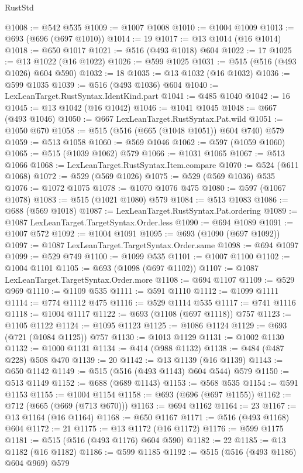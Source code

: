 \begin{lexlean}{RustStd}
\begin{coremodule}
@1008 := @542 @535
@1009 := @1007 @1008
@1010 := @1004 @1009
@1013 := @693 (@696 (@697 @1010))
@1014 := 19
@1017 := @13 @1014 (@16 @1014)
@1018 := @650 @1017
@1021 := @516 (@493 @1018) @604
@1022 := 17
@1025 := @13 @1022 (@16 @1022)
@1026 := @599 @1025
@1031 := @515 (@516 (@493 @1026) @604 @590)
@1032 := 18
@1035 := @13 @1032 (@16 @1032)
@1036 := @599 @1035
@1039 := @516 (@493 @1036) @604
@1040 := LexLeanTarget.RustSyntax.IdentKind.part
@1041 := @485 @1040
@1042 := 16
@1045 := @13 @1042 (@16 @1042)
@1046 := @1041 @1045
@1048 := @667 (@493 @1046)
@1050 := @667 LexLeanTarget.RustSyntax.Pat.wild
@1051 := @1050 @670
@1058 := @515 (@516 (@665 (@1048 @1051)) @604 @740) @579
@1059 := @513 @1058
@1060 := @569 @1046
@1062 := @597 (@1059 @1060)
@1065 := @515 (@1039 @1062) @579
@1066 := @1031 @1065
@1067 := @513 @1066
@1068 := LexLeanTarget.RustSyntax.Item.compare
@1070 := @524 (@611 @1068)
@1072 := @529 (@569 @1026)
@1075 := @529 (@569 @1036) @535
@1076 := @1072 @1075
@1078 := @1070 @1076 @475
@1080 := @597 (@1067 @1078)
@1083 := @515 (@1021 @1080) @579
@1084 := @513 @1083
@1086 := @688 (@569 @1018)
@1087 := LexLeanTarget.RustSyntax.Pat.ordering
@1089 := @1087 LexLeanTarget.TargetSyntax.Order.less
@1090 := @694 @1089
@1091 := @1007 @572
@1092 := @1004 @1091
@1095 := @693 (@1090 (@697 @1092))
@1097 := @1087 LexLeanTarget.TargetSyntax.Order.same
@1098 := @694 @1097
@1099 := @529 @749
@1100 := @1099 @535
@1101 := @1007 @1100
@1102 := @1004 @1101
@1105 := @693 (@1098 (@697 @1102))
@1107 := @1087 LexLeanTarget.TargetSyntax.Order.more
@1108 := @694 @1107
@1109 := @529 @969
@1110 := @1109 @535
@1111 := @591 @1110
@1112 := @1099 @1111
@1114 := @774 @1112 @475
@1116 := @529 @1114 @535
@1117 := @741 @1116
@1118 := @1004 @1117
@1122 := @693 (@1108 (@697 @1118)) @757
@1123 := @1105 @1122
@1124 := @1095 @1123
@1125 := @1086 @1124
@1129 := @693 (@721 (@1084 @1125)) @757
@1130 := @1013 @1129
@1131 := @1002 @1130
@1132 := @1000 @1131
@1134 := @414 (@988 @1132)
@1138 := @484 (@487 @228) @508 @470
@1139 := 20
@1142 := @13 @1139 (@16 @1139)
@1143 := @650 @1142
@1149 := @515 (@516 (@493 @1143) @604 @544) @579
@1150 := @513 @1149
@1152 := @688 (@689 @1143)
@1153 := @568 @535
@1154 := @591 @1153
@1155 := @1004 @1154
@1158 := @693 (@696 (@697 @1155))
@1162 := @712 (@665 (@669 (@713 @670)))
@1163 := @694 @1162
@1164 := 23
@1167 := @13 @1164 (@16 @1164)
@1168 := @650 @1167
@1171 := @516 (@493 @1168) @604
@1172 := 21
@1175 := @13 @1172 (@16 @1172)
@1176 := @599 @1175
@1181 := @515 (@516 (@493 @1176) @604 @590)
@1182 := 22
@1185 := @13 @1182 (@16 @1182)
@1186 := @599 @1185
@1192 := @515 (@516 (@493 @1186) @604 @969) @579

\end{coremodule}
\end{lexlean}
